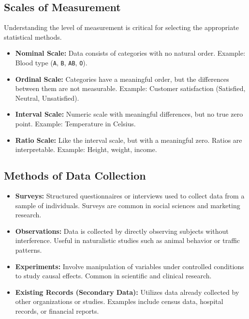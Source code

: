 \subsection{Scales of Measurement}

Understanding the level of measurement is critical for selecting the appropriate statistical methods.

\begin{itemize}
    \item \textbf{Nominal Scale:} Data consists of categories with no natural order. Example: Blood type (\texttt{A}, \texttt{B}, \texttt{AB}, \texttt{O}).

    \item \textbf{Ordinal Scale:} Categories have a meaningful order, but the differences between them are not measurable. Example: Customer satisfaction (Satisfied, Neutral, Unsatisfied).

    \item \textbf{Interval Scale:} Numeric scale with meaningful differences, but no true zero point. Example: Temperature in Celsius.

    \item \textbf{Ratio Scale:} Like the interval scale, but with a meaningful zero. Ratios are interpretable. Example: Height, weight, income.
\end{itemize}

\subsection{Methods of Data Collection}

\begin{itemize}
    \item \textbf{Surveys:} Structured questionnaires or interviews used to collect data from a sample of individuals. Surveys are common in social sciences and marketing research.

    \item \textbf{Observations:} Data is collected by directly observing subjects without interference. Useful in naturalistic studies such as animal behavior or traffic patterns.

    \item \textbf{Experiments:} Involve manipulation of variables under controlled conditions to study causal effects. Common in scientific and clinical research.

    \item \textbf{Existing Records (Secondary Data):} Utilizes data already collected by other organizations or studies. Examples include census data, hospital records, or financial reports.
\end{itemize}

